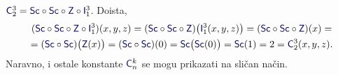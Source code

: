 \begin{primjer}\label{pr:C23}
$\f C_2^3=\f{Sc}\circ\f{Sc}\circ\f Z\circ\f I_1^3$. Doista,
\begin{multline}
(\f{Sc}\circ\f{Sc}\circ\f Z\circ\f I_1^3)(x,y,z)=(\f{Sc}\circ\f{Sc}\circ\f Z)\bigl(\f I_1^3(x,y,z)\bigr)=(\f{Sc}\circ\f{Sc}\circ\f Z)(x)=\\
=(\f{Sc}\circ\f{Sc})\bigl(\f Z(x)\bigr)=(\f{Sc}\circ\f{Sc})(0)=\f{Sc}\bigl(\f{Sc}(0)\bigr)=\f{Sc}(1)=2=\f C_2^3(x,y,z).
\end{multline}
Naravno, i ostale konstante $\f C_n^k$ se mogu prikazati na sličan način.
\end{primjer}


